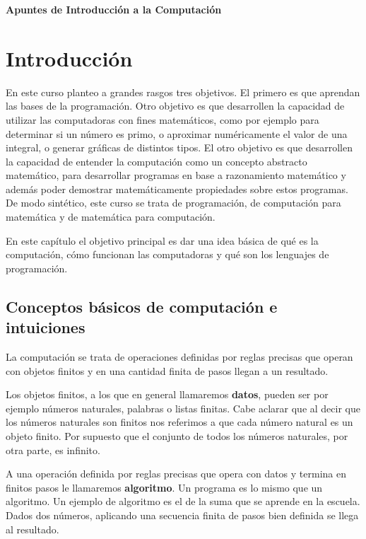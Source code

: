 \documentclass[a4paper, 12pt]{report}
\theoremstyle{definition}
\begin{document}
\centerline{\Huge\bf Apuntes de Introducción a la Computación}



\tableofcontents

\chapter{Introducción}

 En este curso planteo a grandes rasgos tres objetivos. El primero es que aprendan las bases de la programación. 
Otro objetivo es que desarrollen la capacidad de utilizar las computadoras con fines matemáticos, como por ejemplo para determinar si un número es primo, o aproximar numéricamente el valor de una integral, o generar gráficas de distintos tipos.
El otro objetivo es que desarrollen la capacidad de entender la computación como un concepto abstracto matemático, para desarrollar programas en base a razonamiento matemático y además poder demostrar matemáticamente propiedades sobre estos programas.
De modo sintético, este curso se trata de programación, de computación para matemática y de matemática para computación.

En este capítulo el objetivo principal es dar una idea básica de qué es la computación, cómo funcionan las computadoras y qué son los lenguajes de programación.



\section{Conceptos básicos de computación e intuiciones}

La computación se trata de operaciones definidas por reglas precisas que operan con objetos finitos y en una cantidad finita de pasos llegan a un resultado.

Los objetos finitos, a los que en general llamaremos {\bf datos}, pueden ser por ejemplo números naturales, palabras o listas finitas. Cabe aclarar que al decir que los números naturales son finitos nos referimos a que cada número natural es un objeto finito. Por supuesto que el conjunto de todos los números naturales, por otra parte, es infinito.

A una operación definida por reglas precisas que opera con datos y termina en finitos pasos le llamaremos {\bf algoritmo}. Un programa es lo mismo que un algoritmo. Un ejemplo de algoritmo es el de la suma que se aprende en la escuela. Dados dos números, aplicando una secuencia finita de pasos bien definida se llega al resultado.
\end{document}
